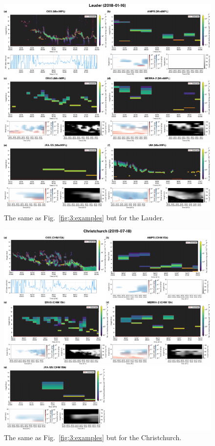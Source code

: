 \begin{figure}[p]
\centerline{\includegraphics[width=1.12\textwidth]{chapter3/fig/examples2_rev2.pdf}}
\caption[The same as Fig.~\ref{fig:3:examples} but for the Lauder.]{
The same as Fig.~\ref{fig:3:examples} but for the Lauder.
}
\label{fig:3:examples2}
\end{figure}

\begin{figure}[p]
\centerline{\includegraphics[width=1.12\textwidth]{chapter3/fig/examples3_rev2.pdf}}
\caption[The same as Fig.~\ref{fig:3:examples} but for the Christchurch]{
The same as Fig.~\ref{fig:3:examples} but for the Christchurch.
}
\label{fig:3:examples3}
\end{figure}

